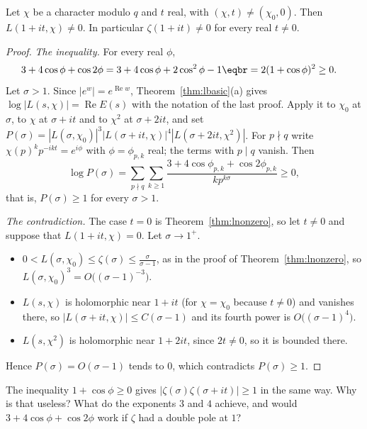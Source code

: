 \begin{theorem}\label{thm:line}
Let $\chi$ be a character modulo $q$ and $t$ real, with $(\chi,t)\ne(\chi_0,0)$. Then $L(1+it,\chi)\ne0$. In particular $\zeta(1+it)\ne0$ for every real $t\ne0$.
\end{theorem}
\begin{proof}
\emph{The inequality.} For every real $\phi$,
\[
\begin{aligned}3+4\cos\phi+\cos2\phi&=3+4\cos\phi+2\cos^2\phi-1\eqbr=2(1+\cos\phi)^2\ge0.\end{aligned}
\]
Let $\sigma>1$. Since $|e^w|=e^{\operatorname{Re}w}$, Theorem~\ref{thm:lbasic}(a) gives $\log|L(s,\chi)|=\operatorname{Re}E(s)$ with the notation of the last proof. Apply it to $\chi_0$ at $\sigma$, to $\chi$
at $\sigma+it$ and to $\chi^2$ at $\sigma+2it$, and set $P(\sigma)=|L(\sigma,\chi_0)|^3|L(\sigma+it,\chi)|^4|L(\sigma+2it,\chi^2)|$. For $p\nmid q$ write $\chi(p)^kp^{-ikt}=e^{i\phi}$ with
$\phi=\phi_{p,k}$ real; the terms with $p\mid q$ vanish. Then
\[
\log P(\sigma)=\sum_{p\nmid q}\sum_{k\ge1}\frac{3+4\cos\phi_{p,k}+\cos2\phi_{p,k}}{kp^{k\sigma}}\ge0,
\]
that is, $P(\sigma)\ge1$ for every $\sigma>1$.

\emph{The contradiction.} The case $t=0$ is Theorem~\ref{thm:lnonzero}, so let $t\ne0$ and suppose that $L(1+it,\chi)=0$. Let $\sigma\to1^+$.
\begin{itemize}
\item $0<L(\sigma,\chi_0)\le\zeta(\sigma)\le\frac\sigma{\sigma-1}$, as in the proof of Theorem~\ref{thm:lnonzero}, so $L(\sigma,\chi_0)^3=O\bigl((\sigma-1)^{-3}\bigr)$.
\item $L(s,\chi)$ is holomorphic near $1+it$ (for $\chi=\chi_0$ because $t\ne0$) and vanishes there, so $|L(\sigma+it,\chi)|\le C(\sigma-1)$ and its fourth power is $O\bigl((\sigma-1)^4\bigr)$.
\item $L(s,\chi^2)$ is holomorphic near $1+2it$, since $2t\ne0$, so it is bounded there.
\end{itemize}
Hence $P(\sigma)=O(\sigma-1)$ tends to $0$, which contradicts $P(\sigma)\ge1$.
\end{proof}

\begin{think}
The inequality $1+\cos\phi\ge0$ gives $|\zeta(\sigma)\zeta(\sigma+it)|\ge1$ in the same way. Why is that useless? What do the exponents $3$ and $4$ achieve, and would $3+4\cos\phi+\cos2\phi$
work if $\zeta$ had a double pole at $1$?
\end{think}

